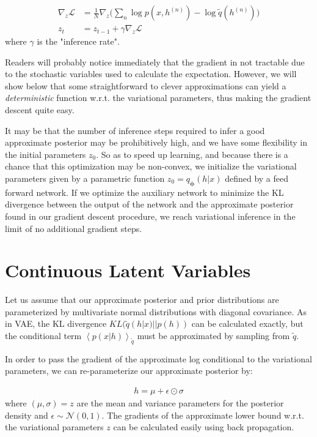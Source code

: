 \documentclass[preprint, twocolumn]{article}
\newcommand{\qexp}[1]{\left<#1\right>}
\newcommand{\vects}[1]{\boldsymbol{#1}}
\newcommand{\PP}[0]{\vects{\phi}}
\newcommand{\grad}[0]{\nabla}
\newcommand{\LL}[0]{\mathcal{L}}
\newcommand{\NN}[0]{\mathcal{N}}
\begin{document}
\begin{align}
\grad_z \LL &= \frac{1}{N} \grad_z \big(\sum_n \log p(x, h^{(n)}) - \log \tilde{q}(h^{(n)})\big) \nonumber \\
z_t &= z_{t-1} + \gamma \grad_z \LL 
\end{align}
where $\gamma$ is the "inference rate".

Readers will probably notice immediately that the gradient in not tractable due to the stochastic variables used to calculate the expectation. However, we will show below that some straightforward to clever approximations can yield a \emph{deterministic} function w.r.t. the variational parameters, thus making the gradient descent quite easy.

It may be that the number of inference steps required to infer a good approximate posterior may be prohibitively high, and we have some flexibility in the initial parameters $z_0$. So as to speed up learning, and because there is a chance that this optimization may be non-convex, we initialize the variational parameters given by a parametric function $z_0 = q_{\PP}(h|x)$ defined by a feed forward network. If we optimize the auxiliary network to minimize the KL divergence between the output of the network and the approximate posterior found in our gradient descent procedure, we reach variational inference in the limit of no additional gradient steps.

\section{Continuous Latent Variables}

Let us assume that our approximate posterior and prior distributions are parameterized by multivariate normal distributions with diagonal covariance. As in VAE, the KL divergence $KL(\tilde{q}(h|x) || p(h))$ can be calculated exactly, but the conditional term $\qexp{p(x|h)}_{\tilde{q}}$ must be approximated by sampling from $\tilde{q}$. 

In order to pass the gradient of the approximate log conditional to the variational parameters, we can re-parameterize our approximate posterior by:

\begin{align}
h = \mu + \epsilon \odot \sigma
\end{align}
where $(\mu, \sigma) = z$ are the mean and variance parameters for the posterior density and $\epsilon \sim \NN(0, 1)$. The gradients of the approximate lower bound w.r.t. the variational parameters $z$ can be calculated easily using back propagation.
\end{document}
